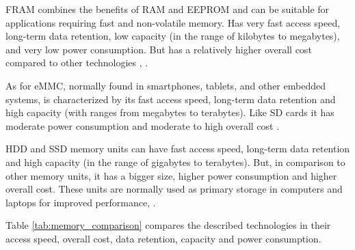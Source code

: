 \gls{FRAM} combines the benefits of \gls{RAM} and \gls{EEPROM} and can be suitable for applications requiring fast and non-volatile memory.
Has very fast access speed, long-term data retention, low capacity (in the range of kilobytes to megabytes), and very low power consumption.
But has a relatively higher overall cost compared to other technologies \cite{mem8}, \cite{mem11}.

As for \gls{eMMC}, normally found in smartphones, tablets, and other embedded systems, is characterized by its fast access speed, long-term data retention and high capacity (with ranges from megabytes to terabytes).
Like \gls{SD} cards it has moderate power consumption and moderate to high overall cost \cite{mem11}.

\gls{HDD} and \gls{SSD} memory units can have fast access speed, long-term data retention and high capacity (in the range of gigabytes to terabytes).
But, in comparison to other memory units, it has a bigger size, higher power consumption and higher overall cost.
These units are normally used as primary storage in computers and laptops for improved performance, \cite{mem10}.

Table \ref{tab:memory_comparison} compares the described technologies in their access speed, overall cost, data retention, capacity and power consumption.
\begin{table}[H]
    \centering
    \caption{Comparison of External Memory Technologies}
    \label{tab:memory_comparison}
\end{table}

